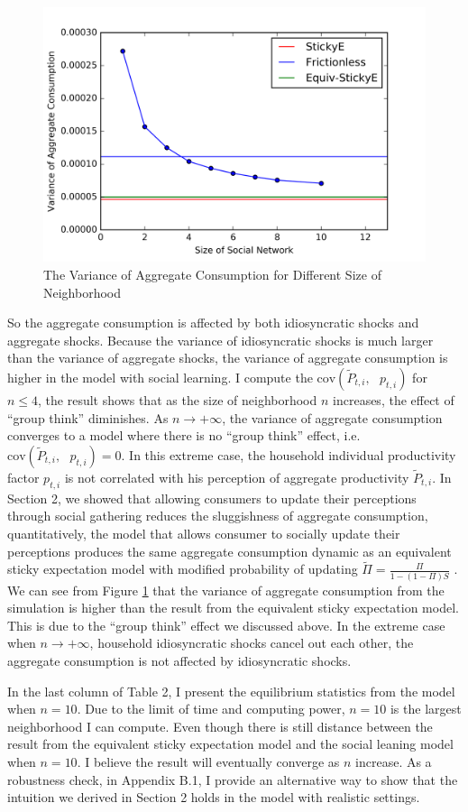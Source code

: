 \documentclass[12pt,letterpaper]{article}
\begin{document}
\begin{figure}[h]
	\includegraphics[scale=0.7]{p_agg.png}
	\centering
	\caption{The Variance of Aggregate Consumption for Different Size of Neighborhood}
	\label{figure:AggModel}
\end{figure}
So the aggregate consumption is affected by both idiosyncratic shocks and aggregate shocks. Because the variance of idiosyncratic shocks is much larger than the variance of aggregate shocks, the variance of aggregate consumption is higher in the model with social learning. I compute the $\text{cov}\left(\tilde{P}_{t,i},\text{ }p_{t,i}\right)$ for $n\leq4$, the result shows that as the size of neighborhood $n$ increases, the effect of ``group think'' diminishes. As $n\rightarrow+\infty$, the variance of aggregate consumption converges to a model where there is no ``group think'' effect, i.e. $\text{cov}\left(\tilde{P}_{t,i},\text{ }p_{t,i}\right)=0$. In this extreme case, the household individual productivity factor $p_{t,i}$ is not correlated with his perception of aggregate productivity $\tilde{P}_{t,i}$. 
In Section 2, we showed that allowing consumers to update their perceptions through social gathering reduces the sluggishness of aggregate consumption, quantitatively, the model that allows consumer to socially update their perceptions produces the same aggregate consumption dynamic as an equivalent sticky expectation model with modified probability of updating $\tilde{\Pi}=\frac{\Pi}{1-\left(1-\Pi\right)S}$ .  We can see from Figure \ref{figure:AggModel} that the variance of aggregate consumption from the simulation is higher than the result from the equivalent sticky expectation model. This is due to the ``group think'' effect we discussed above. In the extreme case when $n\rightarrow+\infty$, household idiosyncratic shocks cancel out each other, the aggregate consumption is not affected by idiosyncratic shocks. \par
In the last column of Table 2, I present the equilibrium statistics from the model when $n=10$. Due to the limit of time and computing power, $n=10$ is the largest neighborhood I can compute. Even though there is still distance between the result from the equivalent sticky expectation model and the social leaning model when $n=10$. I believe the result will eventually converge as $n$ increase. As a robustness check, in Appendix B.1, I provide an alternative way to show that the intuition we derived in Section 2 holds in the model with realistic settings.
\end{document}
